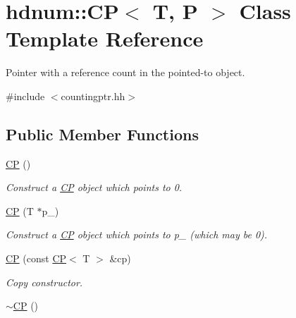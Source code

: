 \hypertarget{classhdnum_1_1CP}{
\section{hdnum::CP$<$ T, P $>$ Class Template Reference}
\label{classhdnum_1_1CP}
}


Pointer with a reference count in the pointed-\/to object.  




{\ttfamily \#include $<$countingptr.hh$>$}

\subsection*{Public Member Functions}
\begin{DoxyCompactItemize}
\item 
\hypertarget{classhdnum_1_1CP_a44d2479eb8eaa687b88dfc8cb7910cf2}{
\hyperlink{classhdnum_1_1CP_a44d2479eb8eaa687b88dfc8cb7910cf2}{CP} ()}
\label{classhdnum_1_1CP_a44d2479eb8eaa687b88dfc8cb7910cf2}

\begin{DoxyCompactList}\small\item\em Construct a \hyperlink{classhdnum_1_1CP}{CP} object which points to 0. \item\end{DoxyCompactList}\item 
\hypertarget{classhdnum_1_1CP_a12f46cf7a0c9e58b2ac7d2e33687e5af}{
\hyperlink{classhdnum_1_1CP_a12f46cf7a0c9e58b2ac7d2e33687e5af}{CP} (T $\ast$p\_\-)}
\label{classhdnum_1_1CP_a12f46cf7a0c9e58b2ac7d2e33687e5af}

\begin{DoxyCompactList}\small\item\em Construct a \hyperlink{classhdnum_1_1CP}{CP} object which points to p\_\- (which may be 0). \item\end{DoxyCompactList}\item 
\hypertarget{classhdnum_1_1CP_a61b2d8e087ef4075862c638d1c2794d5}{
\hyperlink{classhdnum_1_1CP_a61b2d8e087ef4075862c638d1c2794d5}{CP} (const \hyperlink{classhdnum_1_1CP}{CP}$<$ T $>$ \&cp)}
\label{classhdnum_1_1CP_a61b2d8e087ef4075862c638d1c2794d5}

\begin{DoxyCompactList}\small\item\em Copy constructor. \item\end{DoxyCompactList}\item 
\hypertarget{classhdnum_1_1CP_a9054453462ece1b56e0c9c94335f0aff}{
\hyperlink{classhdnum_1_1CP_a9054453462ece1b56e0c9c94335f0aff}{$\sim$CP} ()}
\label{classhdnum_1_1CP_a9054453462ece1b56e0c9c94335f0aff}


\end{DoxyCompactItemize}

